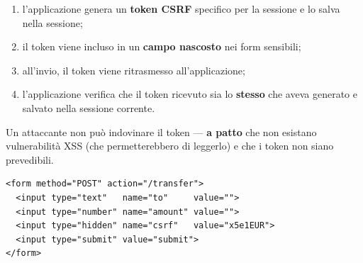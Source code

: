 \begin{enumerate}
  \item l'applicazione genera un \textbf{token CSRF} specifico per la sessione e
        lo salva nella sessione;
  \item il token viene incluso in un \textbf{campo nascosto} nei form sensibili;
  \item all'invio, il token viene ritrasmesso all'applicazione;
  \item l'applicazione verifica che il token ricevuto sia lo \textbf{stesso}
        che aveva generato e salvato nella sessione corrente.
\end{enumerate}

Un attaccante non può indovinare il token --- \textbf{a patto} che non esistano
vulnerabilità XSS (che permetterebbero di leggerlo) e che i token non siano
prevedibili.

\begin{affianco}[0.48][c]
\begin{lstlisting}[style=html, name=transfer.html]
<form method="POST" action="/transfer">
  <input type="text"   name="to"     value="">
  <input type="number" name="amount" value="">
  <input type="hidden" name="csrf"   value="x5e1EUR">
  <input type="submit" value="submit">
</form>
\end{lstlisting}
\risultato
\begin{browser}
  \enspace{}\enspace{}
\end{browser}
\begin{immagine}
\end{immagine}
\end{affianco}

